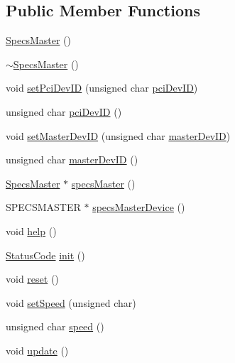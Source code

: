 \subsection*{Public Member Functions}
\begin{DoxyCompactItemize}
\item 
\hyperlink{classSpecsMaster_a39e073d13593ceab986026816aa5a651}{Specs\+Master} ()
\item 
\hyperlink{classSpecsMaster_af55a9b3b84f9bbf62ecb866627e429ba}{$\sim$\+Specs\+Master} ()
\item 
void \hyperlink{classSpecsMaster_a3c55e5652286c35baa41fccd240c8cb5}{set\+Pci\+Dev\+ID} (unsigned char \hyperlink{classSpecsMaster_af4c88071a81c706e2a30ec7786aea707}{pci\+Dev\+ID})
\item 
unsigned char \hyperlink{classSpecsMaster_af4c88071a81c706e2a30ec7786aea707}{pci\+Dev\+ID} ()
\item 
void \hyperlink{classSpecsMaster_acb635bc974bb3f4528e769251c3b30a9}{set\+Master\+Dev\+ID} (unsigned char \hyperlink{classSpecsMaster_a7bbbc2994a3e17bb91a0651eaa241842}{master\+Dev\+ID})
\item 
unsigned char \hyperlink{classSpecsMaster_a7bbbc2994a3e17bb91a0651eaa241842}{master\+Dev\+ID} ()
\item 
\hyperlink{classSpecsMaster}{Specs\+Master} $\ast$ \hyperlink{classSpecsMaster_a2d24cd3fc33848913b0da110b2a804cb}{specs\+Master} ()
\item 
S\+P\+E\+C\+S\+M\+A\+S\+T\+ER $\ast$ \hyperlink{classSpecsMaster_a960d149cda43c1f5744cbb057cb75d1f}{specs\+Master\+Device} ()
\item 
void \hyperlink{classSpecsMaster_ad96a7533c46f01c0f67f330f6fdbf94a}{help} ()
\item 
\hyperlink{classStatusCode}{Status\+Code} \hyperlink{classSpecsMaster_a121457b9c5dff70caf24349c51d37cf5}{init} ()
\item 
void \hyperlink{classSpecsMaster_a0cbd251edefae5f154ec21b1b944d153}{reset} ()
\item 
void \hyperlink{classSpecsMaster_a25c7a250f74f4d1148240f3ab0df160b}{set\+Speed} (unsigned char)
\item 
unsigned char \hyperlink{classSpecsMaster_ad50f852711a25ab247b6bc0603db498d}{speed} ()
\item 
void \hyperlink{classSpecsMaster_abf060966e8205396e326dbbe6cfcc9e8}{update} ()
\end{DoxyCompactItemize}

